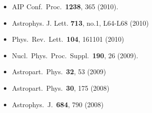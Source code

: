 \documentclass[12pt,letterpaper]{article} %
\begin{document}
{\begin{itemize}
	\item AIP Conf.\ Proc.\  {\bf 1238}, 365 (2010). %
	\item Astrophys. J. Lett. \textbf{713}, no.1, L64-L68 (2010)
	\item Phys.\ Rev.\ Lett.\  {\bf 104}, 161101 (2010) 
	\item Nucl.\ Phys.\ Proc.\ Suppl.\  {\bf 190}, 26 (2009). %
	\item {}Astropart.\ Phys.\  {\bf 32}, 53 (2009)
	\item {}Astropart.\ Phys.\  {\bf 30}, 175 (2008)
	\item {}Astrophys.\ J.\  {\bf 684}, 790 (2008)
	
\end{itemize}

}
\end{document}
